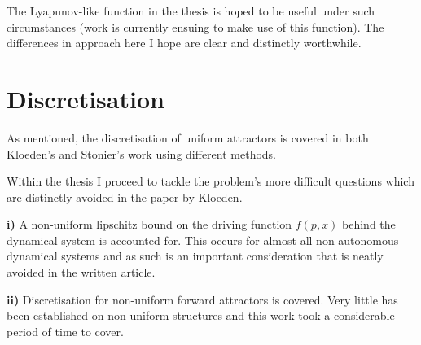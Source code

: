 \documentclass{article}
\begin{document}
The Lyapunov-like function in the thesis is hoped to be useful under such
circumstances (work is currently ensuing to make use of this function). The
differences in approach here I hope are clear and distinctly worthwhile.

\section{Discretisation}

As mentioned, the discretisation of uniform attractors is covered in both
Kloeden's and Stonier's work using different methods.

Within the thesis I proceed to tackle the problem's more difficult
questions which are distinctly avoided in the paper by Kloeden.

\textbf{i)} A non-uniform lipschitz bound on the driving function $f(p, x)$
behind the dynamical system is accounted for. This occurs for almost all
non-autonomous dynamical systems and as such is an important consideration that
is neatly avoided in the written article.

\textbf{ii)} Discretisation for non-uniform forward attractors is covered. Very
little has been established on non-uniform structures and this work took a
considerable period of time to cover.
\end{document}
